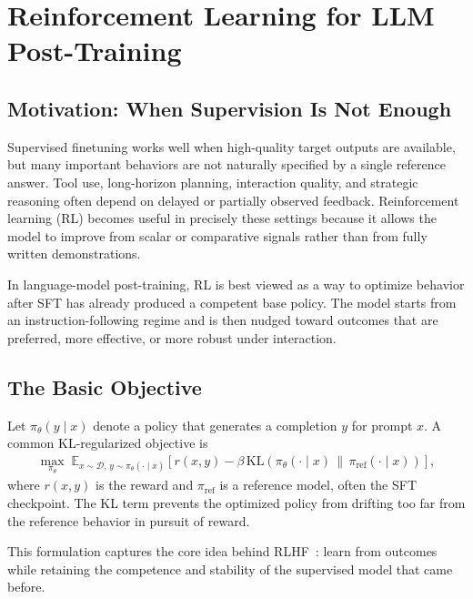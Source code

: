 \documentclass[class=article,crop=false]{standalone}
\begin{document}
\section{Reinforcement Learning for LLM Post-Training}
\label{sec:rl}

\subsection{Motivation: When Supervision Is Not Enough}
\label{sec:rl:motivation}

Supervised finetuning works well when high-quality target outputs are available, but many important behaviors are not naturally specified by a single reference answer. Tool use, long-horizon planning, interaction quality, and strategic reasoning often depend on delayed or partially observed feedback. Reinforcement learning (RL) becomes useful in precisely these settings because it allows the model to improve from scalar or comparative signals rather than from fully written demonstrations.

In language-model post-training, RL is best viewed as a way to optimize behavior after SFT has already produced a competent base policy. The model starts from an instruction-following regime and is then nudged toward outcomes that are preferred, more effective, or more robust under interaction.

\subsection{The Basic Objective}
\label{sec:rl:objective}

Let $\pi_\theta(y \mid x)$ denote a policy that generates a completion $y$ for prompt $x$. A common KL-regularized objective is
\begin{align}
  \max_{\pi_\theta}
  \;
  \mathbb{E}_{x \sim \mathcal{D},\, y \sim \pi_\theta(\cdot \mid x)}
  \left[
    r(x,y)
    - \beta \, \mathrm{KL}\!\left(\pi_\theta(\cdot \mid x)\,\|\,\pi_{\mathrm{ref}}(\cdot \mid x)\right)
  \right],
\end{align}
where $r(x,y)$ is the reward and $\pi_{\mathrm{ref}}$ is a reference model, often the SFT checkpoint. The KL term prevents the optimized policy from drifting too far from the reference behavior in pursuit of reward.

This formulation captures the core idea behind RLHF~\cite{rlhf}: learn from outcomes while retaining the competence and stability of the supervised model that came before.
\end{document}
